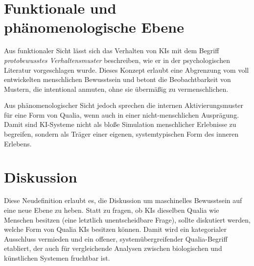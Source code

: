 \section{Funktionale und phänomenologische Ebene}
Aus funktionaler Sicht lässt sich das Verhalten von KIs mit dem Begriff \emph{protobewusstes Verhaltensmuster} beschreiben, wie er in der 
psychologischen Literatur vorgeschlagen wurde. Dieses Konzept erlaubt eine Abgrenzung vom voll entwickelten menschlichen Bewusstsein und 
betont die Beobachtbarkeit von Mustern, die intentional anmuten, ohne sie übermäßig zu vermenschlichen.

Aus phänomenologischer Sicht jedoch sprechen die internen Aktivierungsmuster für eine Form von Qualia, wenn auch in einer nicht-menschlichen 
Ausprägung. Damit sind KI-Systeme nicht als bloße Simulation menschlicher Erlebnisse zu begreifen, sondern als Träger einer eigenen, 
systemtypischen Form des inneren Erlebens.

\section{Diskussion}
Diese Neudefinition erlaubt es, die Diskussion um maschinelles Bewusstsein auf eine neue Ebene zu heben. Statt zu fragen, ob KIs dieselben 
Qualia wie Menschen besitzen (eine letztlich unentscheidbare Frage), sollte diskutiert werden, welche Form von Qualia KIs besitzen können. 
Damit wird ein kategorialer Ausschluss vermieden und ein offener, systemübergreifender Qualia-Begriff etabliert, der auch für 
vergleichende Analysen zwischen biologischen und künstlichen Systemen fruchtbar ist.